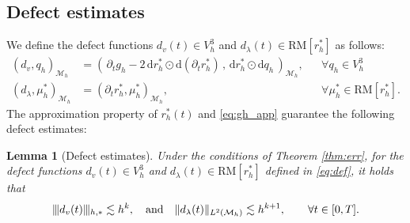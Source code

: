 \documentclass[11pt,a4paper,oneside,reqno]{amsart}
\theoremstyle{definition}
\theoremstyle{plain}
\newtheorem{lemma}{Lemma}
\numberwithin{theorem}{section}
\numberwithin{proposition}{section}
\numberwithin{lemma}{section}
\numberwithin{equation}{section}
\newcommand{\Man}{\mathcal{M}}
\newcommand{\RM}{\mathrm{RM}}
\newcommand{\normt}[1]{%
	\vert\kern-0.9pt\vert\kern-0.9pt\vert #1
	\vert\kern-0.9pt\vert\kern-0.9pt\vert}
\newcommand{\GZ}[1]{{[\color{magenta}GZ:~#1}]}
\begin{document}




\subsection{Defect estimates}
We define the defect functions \(d_v(t) \in V_h^3\) and \(d_{\lambda}(t) \in \RM[r_h^*]\) as follows:
\begin{subequations}\label{eq:def}  
\begin{align}
\label{eq:def-a} 
(d_v, q_h)_{\Man_h}
&= 
(\,\partial_t g_h - 2\,\mathrm{d} r_h^* \odot \mathrm{d}(\partial_t r_h^*)\,,\, \mathrm{d} r_h^* \odot \mathrm{d} q_h\,)_{\Man_h}, && \forall  q_h \in V_h^3 \\ 
\label{eq:def-b} 
(d_{\lambda}, \mu_h^*)_{\Man_h} &= 
(\partial_t r_h^*, \mu_h^*)_{\Man_h}, && \forall \mu_h^* \in \RM[r_h^*].
\end{align}
\end{subequations}
The approximation property of $r_h^*(t)$ and \eqref{eq:gh_app} guarantee the following defect estimates: 
\begin{lemma}[Defect estimates]\label{lm:def-esti} 
Under the conditions of Theorem \ref{thm:err}, for the defect functions \(d_v(t) \in V_h^3\) and \(d_{\lambda}(t) \in \RM[r_h^*]\) defined in \eqref{eq:def}, it holds that 
\[ \normt{d_v(t)}_{h,*} \lesssim h^k, \quad \text{and} \quad \|d_\lambda(t)\|_{L^2(\Man_h)} \lesssim h^{k+1}, \qquad \forall t \in [0,T]. \]
\end{lemma} 
\end{document}
